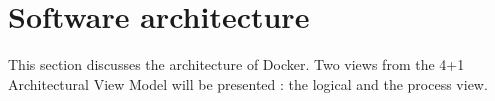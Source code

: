
\clearpage
\chapter{Software architecture}
\label{ch:softwarearch}
This section discusses the architecture of Docker.  Two views from the 4+1
Architectural View Model will be presented : the logical and the process view.



% 



